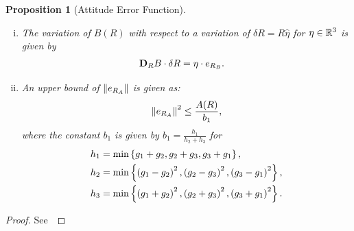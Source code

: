 \documentclass[fleqn]{IJCAS}  %
\newtheorem{prop}{Proposition}
\begin{document}
\begin{multicols}{2}
\begin{prop}[Attitude Error Function]
\begin{enumerate}[(i)]
	\begin{align}
		\dirDiff{A}{R} &= \eta \cdot e_{R_A} .
	\end{align}
	\item \label{item:prop_erb} The variation of \( B(R) \) with respect to a variation of \( \delta R = R \hat{\eta} \) for \( \eta \in \mathbb{R}^3 \) is given by
	\begin{align}
		\mathbf{D}_{R} B \cdot \delta R &= \eta \cdot e_{R_{B}} .
	\end{align}
	\item \label{item:prop_era_upbound}An upper bound of \( \left\| e_{R_A} \right\| \) is given as:
	\begin{align}
		\left\| e_{R_A} \right\|^2 \leq \frac{A(R)}{b_1} , \label{eqn:psi_lower_bound}
	\end{align}
	where the constant \( b_1 \) is given by \( b_1 = \frac{h_1}{h_2 + h_3} \) for 
	\begin{align*}
		h_1 &= \min\left\{ g_1 + g_2, g_2 + g_3 , g_3 + g_1 \right\} ,\\
		h_2 &= \min\left\{ \left( g_1 -g_2 \right)^2,\left( g_2 -g_3 \right)^2 , \left( g_3 -g_1 \right)^2 \right\} ,\\
		h_3 &= \min\left\{ \left( g_1 + g_2 \right)^2, \left( g_2 + g_3 \right)^2 , \left( g_3 + g_1 \right)^2 \right\}.		
	\end{align*}
\end{enumerate}
\end{prop}
\begin{proof}
See~
\end{proof}


\end{multicols}
\end{document}
